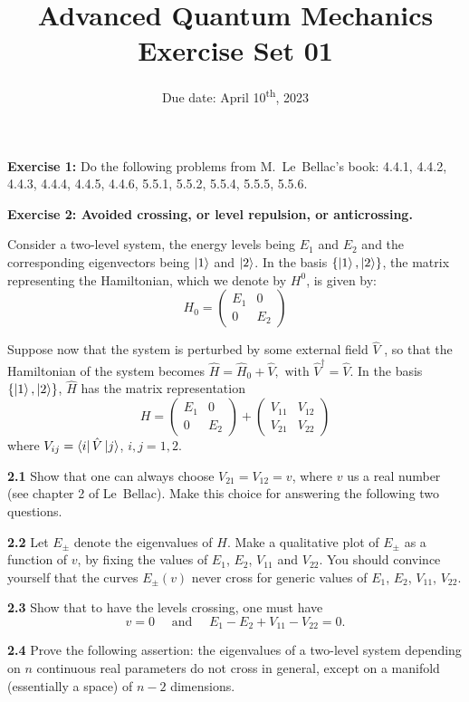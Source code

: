 \documentclass[12pt]{article}
\title{Advanced Quantum Mechanics\\Exercise Set 01}
\date{Due date: April 10\textsuperscript{th}, 2023}
\begin{document}
\maketitle

\textbf{Exercise 1:} Do the following problems from M.~Le~Bellac's book:
4.4.1,
4.4.2,
4.4.3,
4.4.4,
4.4.5,
4.4.6,
5.5.1, 
5.5.2, 
5.5.4, 
5.5.5, 
5.5.6.

\textbf{Exercise 2: Avoided crossing, or level repulsion, or anticrossing.}

Consider a two-level system, the energy levels being $E_1$ and $E_2$ and the corresponding eigenvectors being $\ket{1}$ and $\ket{2}$. 
In the basis $\{\ket{1},\ket{2}\}$, the matrix representing the Hamiltonian, which we denote by $H^0$, is given by:
\[
H_{0}=\left(\begin{array}{cc}E_{1} & 0 \\ 0 & E_{2}\end{array}\right)
\]

Suppose now that the system is perturbed by some external field $\hat{V}$ , so that the Hamiltonian of the system becomes $\hat{H}=\hat{H}_{0}+\hat{V}, \text { with } \hat{V}^{\dagger}=\hat{V}$.
In the basis $\{\ket{1},\ket{2}\}$, $\hat{H}$ has the matrix representation
\[
H=\left(\begin{array}{cc}E_{1} & 0 \\ 0 & E_{2}\end{array}\right)+\left(\begin{array}{ll}V_{11} & V_{12} \\ V_{21} & V_{22}\end{array}\right)
\]
where $V_{ij} = \bra{i}\hat{V}\ket{j}$, $i,j=1,2$.

\textbf{2.1} Show that one can always choose $V_{21} = V_{12} = v$, where $v$ us a real number
(see chapter 2 of Le~Bellac). Make this choice for answering the following two questions.

\textbf{2.2} Let $E_\pm$ denote the eigenvalues of $H$. 
Make a qualitative plot of $E_\pm$ as a function of $v$, by fixing the values of $E_1$, $E_2$, $V_{11}$ and $V_{22}$. 
You should convince yourself that the curves $E_\pm(v)$ never cross for generic values of $E_1$, $E_2$, $V_{11}$, $V_{22}$.

\textbf{2.3} Show that to have the levels crossing, one must have
\[
v=0 \quad \text { and } \quad E_{1}-E_{2}+V_{11}-V_{22}=0.
\]

\textbf{2.4} Prove the following assertion: the eigenvalues of a two-level system depending on $n$ continuous real parameters do not cross in general, except on a manifold (essentially a space) of $n − 2$ dimensions.
\end{document}
